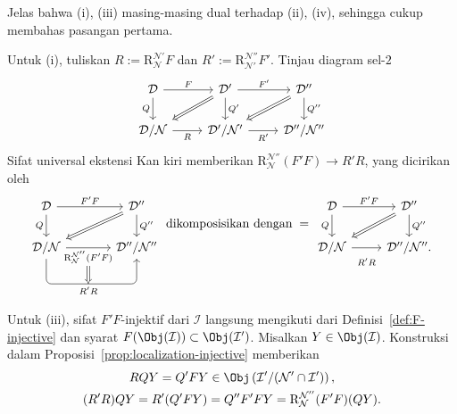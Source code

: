 \begin{bukti}
	Jelas bahwa (i), (iii) masing-masing dual terhadap (ii), (iv), sehingga
	cukup membahas pasangan pertama.

	Untuk (i), tuliskan
	$R:=\mathrm{R}^{\mathcal{N}'}_{\mathcal{N}}F$ dan
	$R':=\mathrm{R}^{\mathcal{N}''}_{\mathcal{N}'}F'$. Tinjau diagram sel-$2$
	\[\begin{tikzcd}
		\mathcal{D} \arrow[r, "F"] \arrow[d, "Q"'] & \mathcal{D}' \arrow[r, "{F'}"] \arrow[d, "{Q'}"] \arrow[Rightarrow, ld] & \mathcal{D}'' \arrow[d, "{Q''}"] \arrow[Rightarrow, ld] \\
		\mathcal{D}/\mathcal{N} \arrow[r, "R"'] & \mathcal{D}'/\mathcal{N}' \arrow[r, "{R'}"'] & \mathcal{D}''/\mathcal{N}''
	\end{tikzcd}\]
	Sifat universal ekstensi Kan kiri memberikan
	$\mathrm{R}^{\mathcal{N}''}_{\mathcal{N}}(F'F)\to R'R$, yang dicirikan oleh
	\begin{equation}\label{eqn:R-composite-aux}\begin{tikzcd}[column sep=large]
			\mathcal{D} \arrow[r, "{F' F}"] \arrow[d, "Q"'] & \mathcal{D}'' \arrow[d, "{Q''}"] \arrow[Rightarrow, ld] \\
			\mathcal{D}/\mathcal{N} \arrow[r, "{\mathrm{R}^{\mathcal{N}''}_{\mathcal{N}} (F'F) }"' {below, name=R}] \arrow[r, "{R' R}"{below, name=RR, pos=0.465}, rounded corners, to path={-- ([yshift=-2em]\tikztostart.south) -- ([yshift=-2em] \tikztotarget.south) [midway]\tikztonodes -- (\tikztotarget) }] & \mathcal{D}''/\mathcal{N}''
			\arrow[Rightarrow, from=R, to=RR]
		\end{tikzcd} \;\text{dikomposisikan dengan}\; = \begin{tikzcd}
			\mathcal{D} \arrow[r, "{F' F}"] \arrow[d, "Q"'] & \mathcal{D}'' \arrow[d, "{Q''}"] \arrow[Rightarrow, ld] \\
			\mathcal{D}/\mathcal{N} \arrow[r, "{R'R}"' inner sep=0.8em] & \mathcal{D}''/\mathcal{N}'' .
	\end{tikzcd}\end{equation}

	Untuk (iii), sifat $F'F$-injektif dari $\mathcal{I}$ langsung mengikuti
	dari Definisi~\ref{def:F-injective} dan syarat
	$F(\Obj(\mathcal{I}))\subset\Obj(\mathcal{I}')$. Misalkan
	$Y\in\Obj(\mathcal{I})$. Konstruksi dalam
	Proposisi~\ref{prop:localization-injective} memberikan
	\begin{gather*}
		RQY = Q'FY \in \Obj \left(\mathcal{I}'/(\mathcal{N}'\cap\mathcal{I}')\right), \\
		(R'R)QY = R'(Q'FY) = Q'' F'FY = \mathrm{R}^{\mathcal{N}''}_{\mathcal{N}} (F' F)(QY).
	\end{gather*}


\end{bukti}
